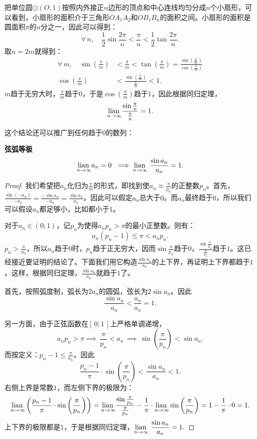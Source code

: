\documentclass[12pt,UTF8,fontset=none]{ctexbook}
\begin{document}
把单位圆$\odot(O,1)$按照内外接正$n$边形的顶点和中心连线均匀分成$n$个小扇形，可以看到，小扇形的面积介于三角形$OA_1A_2$和$OB_1B_n$的面积之间。小扇形的面积是圆面积$\pi$的$n$分之一，因此可以得到：
$$ \forall \,n,\quad \frac{1}{2}\sin{\frac{2\pi}{n}} < \frac{\pi}{n} < \frac{1}{2}\tan{\frac{2\pi}{n}}. $$
取$n = 2m$就得到：
\begin{align*}
    \forall \,m,\quad \sin{\left(\frac{\pi}{m}\right)} &< \frac{\pi}{m} < \tan{\left(\frac{\pi}{m}\right)} = \frac{\sin{\left(\frac{\pi}{m}\right)}}{\cos{\left(\frac{\pi}{m}\right)}} \\
    \cos{\left(\frac{\pi}{m}\right)} &< \frac{\sin{\left(\frac{\pi}{m}\right)}}{\frac{\pi}{m}} < 1.
\end{align*}
$m$趋于无穷大时，$\frac{\pi}{m}$趋于$0$，于是$\cos{\left(\frac{\pi}{m}\right)}$趋于$1$，因此根据同归定理，
$$ \underset{n\to\infty}{\operatorname{lian}\,} \frac{\sin{\frac{\pi}{n}}}{\frac{\pi}{n}} = 1. $$

这个结论还可以推广到任何趋于$0$的数列：
\begin{tm}{\textbf{弦弧等极}}
    $$\underset{n\to\infty}{\operatorname{lian}\,} a_n = 0 \,\,\implies \underset{n\to\infty}{\operatorname{lian}\,} \,\,\frac{\sin{a_n}}{a_n} = 1. $$
\end{tm}

\begin{proof}
    我们希望把$a_n$化归为$\frac{\pi}{m}$的形式，即找到使$a_n\approx \frac{\pi}{p_n}$的正整数$p_n$。首先，$\frac{\sin{(-a_n)}}{-a_n} = \frac{-\sin{a_n}}{-a_n} = \frac{\sin{a_n}}{a_n}$。因此可以假定$a_n$总大于$0$。而$a_n$最终趋于$0$，所以我们可以假设$a_n$都足够小，比如都小于$1$。

    对于$a_n\in(0;1)$，记$p_n$为使得$a_n p_n > \pi$的最小正整数。则有：
    $$ a_n(p_n - 1) \leqslant \pi < a_np_n. $$
    $p_n > \frac{\pi}{a_n}$，所以$a_n$趋于$0$时，$p_n$趋于正无穷大，因而$\sin{\frac{\pi}{p_n}}$趋于$0$，$\frac{\sin{\frac{\pi}{p_n}}}{\frac{\pi}{p_n}}$趋于$1$。这已经接近要证明的结论了。下面我们用它构造$\frac{\sin{a_n}}{a_n}$的上下界，再证明上下界都趋于$1$。这样，根据同归定理，$\frac{\sin{a_n}}{a_n}$就趋于$1$了。
    
    首先，按照弧度制，弧长为$2a_n$的圆弧，弦长为$2\sin{a_n}$。因此
    $$\frac{\sin{a_n}}{a_n} < \frac{a_n}{a_n} = 1.$$

    另一方面，由于正弦函数在$[\,0;1\,]$上严格单调递增，
    $$a_n p_n > \pi \implies \,\frac{\pi}{p_n} < a_n  \,\implies \,\sin{\left(\frac{\pi}{p_n}\right)} < \sin{a_n}. $$
    而按定义：$p_n - 1 \leqslant \frac{\pi}{a_n}$。因此
    $$ \frac{p_n - 1}{\pi}\cdot\sin{\left(\frac{\pi}{p_n}\right)} < \frac{\sin{a_n}}{a_n} < 1.$$
    右侧上界是常数$1$，而左侧下界的极限为：
    $$ \underset{n\to\infty}{\operatorname{lian}\,}\left(\frac{p_n - 1}{\pi}\cdot\sin{\left(\frac{\pi}{p_n}\right)}\right) = \underset{n\to\infty}{\operatorname{lian}\,}\frac{\sin{\frac{\pi}{p_n}}}{\frac{\pi}{p_n}} - \frac{1}{\pi}\cdot\underset{n\to\infty}{\operatorname{lian}\,}\sin{\left(\frac{\pi}{p_n}\right)} = 1 - \frac{1}{\pi}\cdot 0 = 1.$$
    上下界的极限都是$1$，于是根据同归定理，$\displaystyle \underset{n\to\infty}{\operatorname{lian}\,} \,\,\frac{\sin{a_n}}{a_n} = 1.$
\end{proof}
\end{document}
